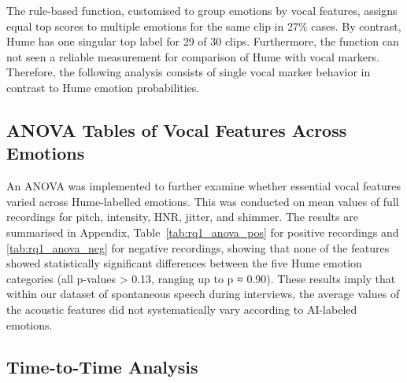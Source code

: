 The rule-based function, customised to group emotions by vocal features, assigns equal top scores to multiple emotions for the same clip in 27\% cases.
By contrast, Hume has one singular top label for 29 of 30 clips. Furthermore, the function can not seen a reliable measurement for comparison of Hume with vocal markers. 
Therefore, the following analysis consists of single vocal marker behavior in contrast to Hume emotion probabilities. 
    

\subsection{ANOVA Tables of Vocal Features Across Emotions}
An ANOVA was implemented to further examine whether essential vocal features varied across Hume-labelled emotions. This was conducted on mean values of full recordings for pitch, intensity, HNR, jitter, and shimmer. 
The results are summarised in Appendix, Table~\ref{tab:rq1_anova_pos} for positive recordings and \ref{tab:rq1_anova_neg} for negative recordings, 
showing that none of the features showed statistically significant differences between the five Hume emotion categories (all p-values > 0.13, ranging up to p ≈ 0.90). 
These results imply that within our dataset of spontaneous speech during interviews, the average values of the acoustic features did not systematically vary according to AI-labeled emotions. 

\subsection{Time-to-Time Analysis}


